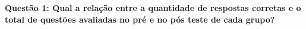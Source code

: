 \textbf{Questão 1: Qual a relação entre a quantidade de respostas corretas e o total de questões avaliadas no pré e no pós teste de cada grupo?}



